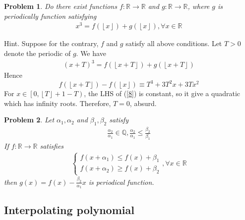 \documentclass{article}
\newtheorem{problem}{Problem}
\begin{document}
\begin{problem}
	Do there exist functions $f: \mathbb{R} \to \mathbb{R}$ and $g: \mathbb{R} \to \mathbb{R}$, where $g$ is periodically function satisfying
	\begin{align}
		{x^3} = f\left( {\left\lfloor x \right\rfloor } \right) + g\left( {\left\lfloor x \right\rfloor } \right),\forall x \in \mathbb{R}
	\end{align}
\end{problem}
{\sf Hint.} Suppose for the contrary, $f$ and $g$ satisfy all above conditions. Let $T>0$ denote the periodic of $g$. We have
\begin{align}
	{\left( {x + T} \right)^3} = f\left( {\left\lfloor {x + T} \right\rfloor } \right) + g\left( {\left\lfloor {x + T} \right\rfloor } \right)
\end{align}
Hence
\begin{equation}
	\label{8}
	f\left( {\left\lfloor {x + T} \right\rfloor } \right) - f\left( {\left\lfloor x \right\rfloor } \right) \equiv {T^3} + 3{T^2}x + 3T{x^2}
\end{equation}
For $x \in \left[ {0,\left\lfloor T \right\rfloor  + 1 - T} \right)$, the LHS of (\ref{8}) is constant, so it give a quadratic which has infinity roots. Therefore, $T=0$, absurd.

\begin{problem}
	Let $\alpha_1,\alpha_2$ and $\beta_1,\beta_2$ satisfy
	\begin{align}
		\frac{{{\alpha _2}}}{{{\alpha _1}}} \in \mathbb{Q},\frac{{{\alpha _2}}}{{{\alpha _1}}} \le \frac{{{\beta _2}}}{{{\beta _1}}}
	\end{align}
	If $f: \mathbb{R} \to \mathbb{R}$ satisfies
	\begin{align}
		\left\{ {\begin{array}{*{20}{c}}
				{f\left( {x + {\alpha _1}} \right) \le f\left( x \right) + {\beta _1}}\\
				{f\left( {x + {\alpha _2}} \right) \ge f\left( x \right) + {\beta _2}}
		\end{array}} \right.,\forall x \in \mathbb{R}
	\end{align}
	then $g\left( x \right) = f\left( x \right) - \frac{{{\beta _2}}}{{{\alpha _1}}}x$ is periodical function.
\end{problem}

\subsection{Interpolating polynomial}
\end{document}
